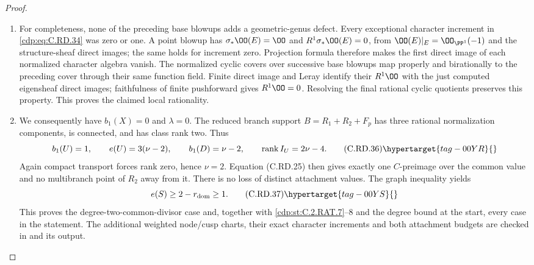 \begin{proof}
\begin{enumerate}[label={$\langle1\rangle$\arabic*.},leftmargin=*]
\item For completeness, none of the preceding
base blowups adds a geometric-genus defect.
Every exceptional character increment in
\eqref{cdp:eq:C.RD.34} was zero or one. A point blowup
has $\sigma_*\OO(E)=\OO$ and
$R^1\sigma_*\OO(E)=0$, from
$\OO(E)|_E=\OO_{\PP^1}(-1)$ and the
structure-sheaf direct images; the same
holds for increment zero. Projection formula
therefore makes the first direct image of
each normalized character algebra vanish.
The normalized cyclic covers over successive
base blowups map properly and birationally
to the preceding cover through their same
function field. Finite direct image and
Leray identify their $R^1\OO$ with the
just computed eigensheaf direct images;
faithfulness of finite pushforward gives
$R^1\OO=0$. Resolving the final rational
cyclic quotients preserves this property.
This proves the claimed local rationality.

\item We consequently have $b_1(X)=0$ and
$\lambda=0$. The reduced branch support
$B=R_1+R_2+F_p$ has three rational
normalization components, is connected,
and has class rank two. Thus
\[
 b_1(U)=1,\qquad e(U)=3(\nu-2),\qquad
 b_1(D)=\nu-2,\qquad
          \operatorname{rank}I_U=2\nu-4.
\tag{C.RD.36}\hypertarget{tag-00YR}{}\label{cdp:eq:C.RD.36}
\]
Again compact transport forces rank zero,
hence $\nu=2$.
Equation (C.RD.25) then gives exactly one
$C$-preimage over the common value and no
multibranch point of $R_2$ away from it.
There is no loss of distinct attachment
values. The graph inequality yields
\[
                    e(S)\ge2-r_{\rm dom}\ge1.
\tag{C.RD.37}\hypertarget{tag-00YS}{}\label{cdp:eq:C.RD.37}
\]
This proves the degree-two-common-divisor
case and, together with \ref{cdp:st:C.2.RAT.7}--8 and
the degree bound at the start, every case
in the statement.
The additional weighted node/cusp charts,
their exact character increments and both
attachment budgets are checked in
 and its output.

\end{enumerate}
\end{proof}
